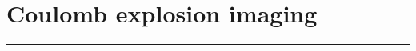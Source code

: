 \chapter{Coulomb explosion imaging}\label{ch:CEI}

\vspace{-1.5 em}
\begin{addmargin}[-0.5cm]{0cm}
  \minitoc
\end{addmargin}
\hrule
\vspace{1.5 em}




